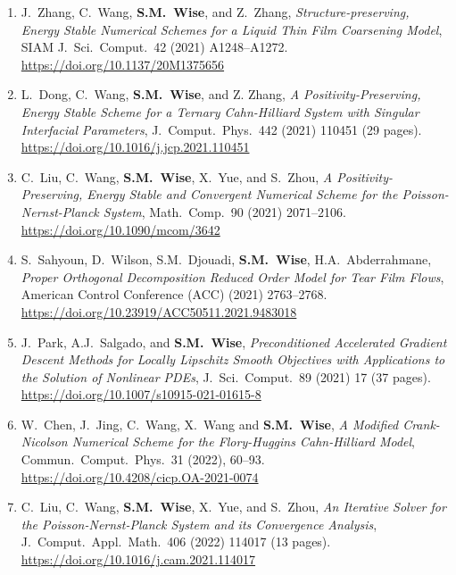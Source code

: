 \documentclass[11pt]{letter}
\begin{document}
\begin{enumerate}
	\item
J.~Zhang, C.~Wang, \textbf{S.M.~Wise}, and Z.~Zhang, {\sl Structure-preserving, Energy Stable Numerical Schemes for a Liquid Thin Film Coarsening Model}, SIAM J.~Sci.~Comput.~42 (2021) A1248--A1272.
	\\ 
\url{https://doi.org/10.1137/20M1375656}

	\item
L.~Dong, C.~Wang, \textbf{S.M.~Wise}, and Z. Zhang, {\sl A Positivity-Preserving, Energy Stable Scheme for a Ternary Cahn-Hilliard System with Singular Interfacial Parameters}, J.~Comput.~Phys.~442 (2021) 110451 (29 pages).
	\\ 
\url{https://doi.org/10.1016/j.jcp.2021.110451}

	\item
C.~Liu, C.~Wang, \textbf{S.M.~Wise}, X.~Yue, and S.~Zhou, {\sl A Positivity-Preserving, Energy Stable and Convergent Numerical Scheme for the Poisson-Nernst-Planck System}, Math.~Comp.~90 (2021) 2071--2106.
	\\ 
\url{https://doi.org/10.1090/mcom/3642}

	\item
S.~Sahyoun, D.~Wilson, S.M.~Djouadi, \textbf{S.M.~Wise}, H.A.~Abderrahmane, {\sl Proper Orthogonal Decomposition Reduced Order Model for Tear Film Flows}, American Control Conference (ACC) (2021) 2763--2768.
	\\
\url{https://doi.org/10.23919/ACC50511.2021.9483018}

	\item
J.~Park, A.J.~Salgado, and \textbf{S.M.~Wise}, {\sl Preconditioned Accelerated Gradient Descent Methods for Locally Lipschitz Smooth Objectives with Applications to the Solution of Nonlinear PDEs}, J.~Sci.~Comput.~89 (2021) 17 (37 pages).
	\\ 
\url{https://doi.org/10.1007/s10915-021-01615-8}

	\item
W.~Chen, J.~Jing, C.~Wang, X.~Wang and \textbf{S.M.~Wise}, {\sl A Modified Crank-Nicolson Numerical Scheme for the Flory-Huggins Cahn-Hilliard Model}, Commun.~Comput.~Phys.~31 (2022), 60--93.
	\\ 
\url{https://doi.org/10.4208/cicp.OA-2021-0074}

	\item
C.~Liu, C.~Wang, \textbf{S.M.~Wise}, X.~Yue, and S.~Zhou, {\sl An Iterative Solver for the Poisson-Nernst-Planck System and its Convergence Analysis},  J.~Comput.~Appl.~Math.~406 (2022) 114017 (13 pages).
	\\ 
\url{https://doi.org/10.1016/j.cam.2021.114017}


\end{enumerate}
\end{document}

